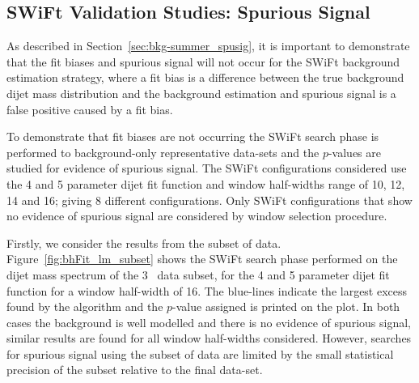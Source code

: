
\subsection{SWiFt Validation Studies: Spurious Signal}
\label{sec:bkg-full_spuriousSignal}

As described in Section~\ref{sec:bkg-summer_spusig}, it is important to demonstrate that the
fit biases and spurious signal will not occur for the SWiFt background estimation strategy,
where a fit bias is a difference between the true background
dijet mass distribution and the background estimation
and spurious signal is a false positive caused by a fit bias.

To demonstrate that fit biases are not occurring the SWiFt search phase is performed to background-only representative data-sets
and the \bh{} $p$-values are studied for evidence of spurious signal.
The SWiFt configurations considered use the 4 and 5 parameter dijet fit function
and window half-widths range of 10, 12, 14 and 16; giving 8 different configurations.
Only SWiFt configurations that show no evidence of spurious signal are considered by window selection procedure.

Firstly, we consider the results from the subset of data.
Figure~\ref{fig:bhFit_lm_subset} shows the SWiFt search phase performed on the dijet mass spectrum of the 3~\ifb{} data subset,
for the 4 and 5 parameter dijet fit function for a window half-width of 16.
The blue-lines indicate the largest excess found by the \bh{} algorithm and the \mbox{$p$-value} assigned is printed on the plot. 
In both cases the background is well modelled and there is no evidence of spurious signal,
similar results are found for all window half-widths considered.
However, searches for spurious signal using the subset of data are limited by the 
small statistical precision of the subset relative to the final data-set.

